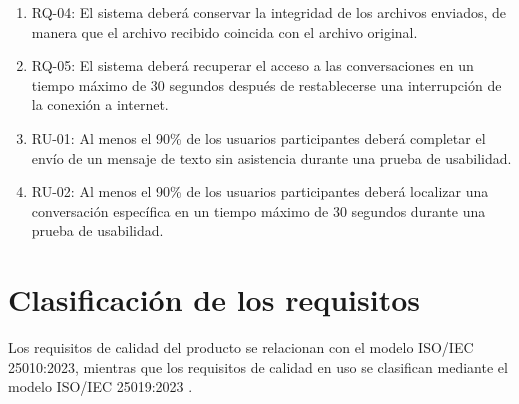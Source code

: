 \documentclass[12pt,a4paper,oneside]{article}
\begin{document}
\begin{enumerate}[leftmargin=1.5cm]
    \item RQ-04: El sistema deberá conservar la integridad de los archivos enviados, de manera que el archivo recibido coincida con el archivo original.

    \item RQ-05: El sistema deberá recuperar el acceso a las conversaciones en un tiempo máximo de 30 segundos después de restablecerse una interrupción de la conexión a internet.

    \item RU-01: Al menos el 90\% de los usuarios participantes deberá completar el envío de un mensaje de texto sin asistencia durante una prueba de usabilidad.

    \item RU-02: Al menos el 90\% de los usuarios participantes deberá localizar una conversación específica en un tiempo máximo de 30 segundos durante una prueba de usabilidad.

\end{enumerate}


\section{Clasificación de los requisitos}

Los requisitos de calidad del producto se relacionan con el modelo ISO/IEC 25010:2023, mientras que los requisitos de calidad en uso se clasifican mediante el modelo ISO/IEC 25019:2023 \cite{iso25010,iso25019}.
\end{document}
